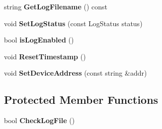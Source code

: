 \begin{DoxyCompactItemize}
\item 
\hypertarget{class_logger_a17657ebe893d22cf1052448785123651}{string {\bfseries Get\-Log\-Filename} () const }\label{class_logger_a17657ebe893d22cf1052448785123651}

\item 
\hypertarget{class_logger_a2b697478ebf7af4cc87cd874a1da740c}{void {\bfseries Set\-Log\-Status} (const Log\-Status status)}\label{class_logger_a2b697478ebf7af4cc87cd874a1da740c}

\item 
\hypertarget{class_logger_a9c698f7ca23bf3ed8c33b95626f3d3ac}{bool {\bfseries is\-Log\-Enabled} ()}\label{class_logger_a9c698f7ca23bf3ed8c33b95626f3d3ac}

\item 
\hypertarget{class_logger_a7cc0f69aa4a1b166a2fc5995d07854f7}{void {\bfseries Reset\-Timestamp} ()}\label{class_logger_a7cc0f69aa4a1b166a2fc5995d07854f7}

\item 
\hypertarget{class_logger_af050a335c60943edfc6a20661ce4fb0d}{void {\bfseries Set\-Device\-Address} (const string \&addr)}\label{class_logger_af050a335c60943edfc6a20661ce4fb0d}

\end{DoxyCompactItemize}
\subsection*{Protected Member Functions}
\begin{DoxyCompactItemize}
\item 
\hypertarget{class_logger_adeb4634aa851e28223a009ea084151ad}{bool {\bfseries Check\-Log\-File} ()}\label{class_logger_adeb4634aa851e28223a009ea084151ad}

\end{DoxyCompactItemize}
